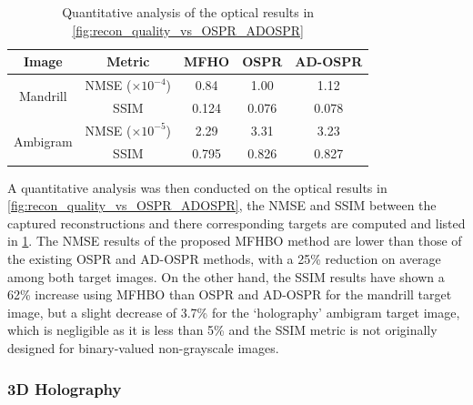 	\begin{table}[H]
	\centering
	\begin{tabular}{|c|c|c|c|c|}
	\hline
	\textbf{Image}              & \textbf{Metric}    & \textbf{MFHO}  & \textbf{OSPR}  & \textbf{AD-OSPR} \\ \hline
	\multirow{2}{*}{Mandrill}   & NMSE ($\times 10^{-4}$) & 0.84      & 1.00           & 1.12             \\ \cline{2-5}
								& SSIM               & 0.124          & 0.076          & 0.078            \\ \hline
	\multirow{2}{*}{Ambigram}   & NMSE ($\times 10^{-5}$) & 2.29      & 3.31           & 3.23             \\ \cline{2-5}
								& SSIM               & 0.795          & 0.826          & 0.827            \\ \hline
	\end{tabular}
	\caption{Quantitative analysis of the optical results in \cref{fig:recon_quality_vs_OSPR_ADOSPR}}
	\label{tab:quantitative_vs_OSPR_ADOSPR}
	\end{table}

	A quantitative analysis was then conducted on the optical results in \cref{fig:recon_quality_vs_OSPR_ADOSPR}, the NMSE and SSIM between the captured reconstructions and there corresponding targets are computed and listed in \cref{tab:quantitative_vs_OSPR_ADOSPR}. The NMSE results of the proposed MFHBO method are lower than those of the existing OSPR and AD-OSPR methods, with a 25\% reduction on average among both target images. On the other hand, the SSIM results have shown a 62\% increase using MFHBO than OSPR and AD-OSPR for the mandrill target image, but a slight decrease of 3.7\% for the `holography' ambigram target image, which is negligible as it is less than 5\% and the SSIM metric is not originally designed for binary-valued non-grayscale images.

\subsubsection{3D Holography}

